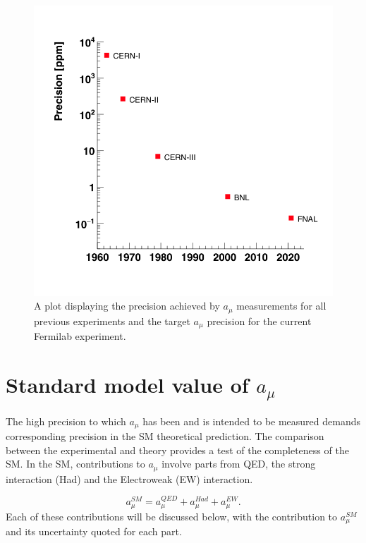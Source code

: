 \begin{figure}[th]
\centering
\includegraphics[scale=0.45]{Figures/gm2_precision_vs_time.png}
\decoRule
\caption{A plot displaying the precision achieved by $a_{\mu}$ measurements for all previous experiments and the target $a_{\mu}$ precision for the current Fermilab experiment.}
\label{fig:gm2_precision_vs_time.png}
\end{figure}

\section{Standard model value of $a_{\mu}$}
\label{sec:sm_amu}

The high precision to which $a_{\mu}$ has been and is intended to be measured demands corresponding precision in the SM theoretical prediction. The comparison between the experimental and theory provides a test of the completeness of the SM. In the SM, contributions to $a_{\mu}$ involve parts from QED, the strong interaction (Had) and the Electroweak (EW) interaction.

\begin{equation}
a_{\mu}^{SM}=a_{\mu}^{QED} + a_{\mu}^{Had} + a_{\mu}^{EW}.
\end{equation}
Each of these contributions will be discussed below, with the contribution to $a_{\mu}^{SM}$ and its uncertainty quoted for each part. 

